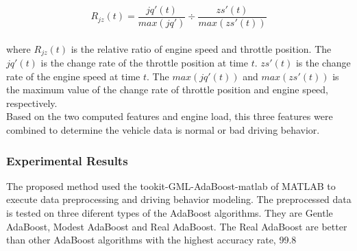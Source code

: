 \begin{equation}
\label{eqa:ada_relative_eng_thr}
R_{jz}(t) = \dfrac{jq'(t)}{max(jq')} \div \dfrac{zs'(t)}{max(zs'(t))}
\end{equation}
\\
where $R_{jz}(t)$ is the relative ratio of engine speed and throttle position. The $jq'(t)$ is the change rate of the throttle position at time $t$. $zs'(t)$ is the change rate of the engine speed at time $t$. The $max(jq'(t))$ and $max(zs'(t))$ is the maximum value of the change rate of throttle position and engine speed, respectively.\\

Based on the two computed features and engine load, this three features were combined to determine the vehicle data is normal or bad driving behavior.

\subsubsection{Experimental Results}
The proposed method used the tookit-GML-AdaBoost-matlab of MATLAB to execute data preprocessing and driving behavior modeling. The preprocessed data is tested on three diferent types of the AdaBoost algorithms. They are Gentle AdaBoost, Modest AdaBoost and Real AdaBoost. The Real AdaBoost are better than other AdaBoost algorithms with the highest accuracy rate, 99.8%